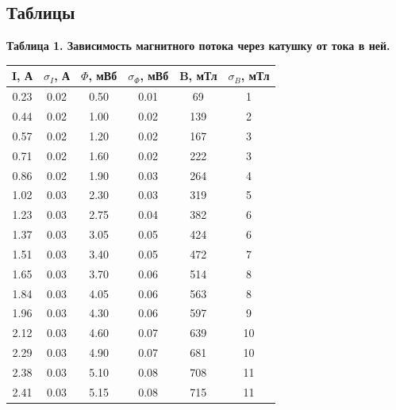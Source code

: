 \documentclass[15pt,a5paper,reqno]{article}
\begin{document}
    \subsection{Таблицы}

    \noindent\hypertarget{table_1}{\textbf{Таблица 1. Зависимость магнитного потока через катушку от тока в ней.}}
    \begin{center}
        \begin{tabular}{|c|c|c|c|c|c|}
        \hline
        I, А & $\sigma_I$, А & $\Phi$, мВб & $\sigma_{\Phi}$, мВб & B, мТл & $\sigma_B$, мТл  \\ \hline\hline
        0.23 & 0.02          & 0.50        & 0.01                 & 69     & 1  \\ \hline
        0.44 & 0.02          & 1.00        & 0.02                 & 139    & 2  \\ \hline
        0.57 & 0.02          & 1.20        & 0.02                 & 167    & 3  \\ \hline
        0.71 & 0.02          & 1.60        & 0.02                 & 222    & 3  \\ \hline
        0.86 & 0.02          & 1.90        & 0.03                 & 264    & 4  \\ \hline
        1.02 & 0.03          & 2.30        & 0.03                 & 319    & 5  \\ \hline
        1.23 & 0.03          & 2.75        & 0.04                 & 382    & 6  \\ \hline
        1.37 & 0.03          & 3.05        & 0.05                 & 424    & 6  \\ \hline
        1.51 & 0.03          & 3.40        & 0.05                 & 472    & 7  \\ \hline
        1.65 & 0.03          & 3.70        & 0.06                 & 514    & 8  \\ \hline
        1.84 & 0.03          & 4.05        & 0.06                 & 563    & 8  \\ \hline
        1.96 & 0.03          & 4.30        & 0.06                 & 597    & 9  \\ \hline
        2.12 & 0.03          & 4.60        & 0.07                 & 639    & 10 \\ \hline
        2.29 & 0.03          & 4.90        & 0.07                 & 681    & 10 \\ \hline
        2.38 & 0.03          & 5.10        & 0.08                 & 708    & 11 \\ \hline
        2.41 & 0.03          & 5.15        & 0.08                 & 715    & 11 \\ \hline
        \end{tabular}
    \end{center}
\end{document}
